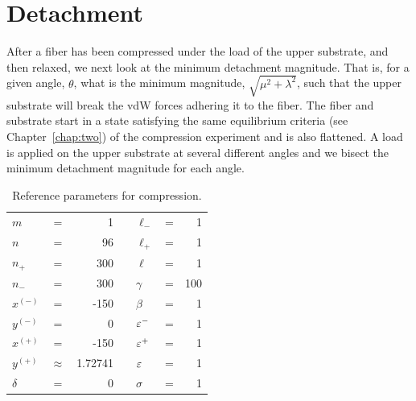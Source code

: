 \section{Detachment} \label{ch:detachment}

After a fiber has been compressed under the load of the upper substrate, and then relaxed, we next look at the minimum detachment magnitude. That is, for a given angle, $\theta$, what is the minimum magnitude, $\sqrt{\mu^2 + \lambda^2}$, such that the upper substrate will break the vdW forces adhering it to the fiber. The fiber and substrate start in a state satisfying the same equilibrium criteria (see Chapter~\ref{chap:two}) of the compression experiment and is also flattened. A load is applied on the upper substrate at several different angles and we bisect the minimum detachment magnitude for each angle.

	\begin{table}
		\centering
		\caption{Reference parameters for compression. \label{table:detachment_reference}}
		\begin{tabular}{lcrclcr}
			$m$ & = & 1 & \hspace{1in} & $\ell_-$ & = & 1 \\
			$n$ & = & 96 & & $\ell_+$ & = & 1 \\
			$n_+$ & = & 300 & & $\ell$ & = & 1 \\
			$n_-$ & = & 300 & & $\gamma$ & = & 100 \\
			$x^{(-)}$ & = & -150 & & $\beta$ & = & 1 \\
			$y^{(-)}$ & = & 0 & & $\varepsilon^-$ & = & 1 \\
			$x^{(+)}$ & = & -150 & & $\varepsilon^+$ & = & 1 \\
			$y^{(+)}$ & $\approx$ & 1.72741 & & $\varepsilon$ & = & 1 \\
			$\delta$ & = & 0 & & $\sigma$ & = & 1
		\end{tabular}
	\end{table}
	
